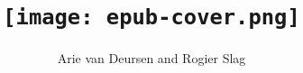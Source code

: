\usepackage[T1]{fontenc}
\usepackage{textcomp}
\usepackage{mathpazo}
\usepackage{tgpagella}

\usepackage{a4wide}
\setlength{\textheight}{200mm}

\title{\texttt{[image: epub-cover.png]}}

\author{Arie van Deursen and Rogier Slag}


